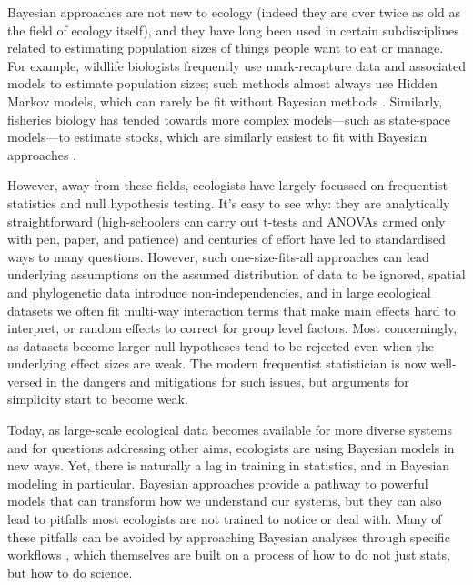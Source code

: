 \documentclass[11pt]{article}
\begin{document}
{Bayesian approaches are not new to ecology (indeed they are over twice as old as the field of ecology itself), and they have long been used in certain subdisciplines related to estimating population sizes of things people want to eat or manage. For example, wildlife biologists frequently use mark-recapture data and associated models to estimate population sizes; such methods almost always use Hidden Markov models, which can rarely be fit without Bayesian methods \citep{muthuku2008,zheng2007}. Similarly, fisheries biology has tended towards more complex models---such as state-space models---to estimate stocks, which are similarly easiest to fit with Bayesian approaches \citep{trijoulet2018,millar2000}. %

However, away from these fields, ecologists have largely focussed on frequentist statistics and null hypothesis testing. It's easy to see why: they are analytically straightforward (high-schoolers can carry out t-tests and ANOVAs armed only with pen, paper, and patience) and centuries of effort have led to standardised ways to many questions. 
However, such one-size-fits-all approaches can lead underlying assumptions on the assumed distribution of data to be ignored, spatial and phylogenetic data introduce non-independencies, and in large ecological datasets we often fit multi-way interaction terms that make main effects hard to interpret, or random effects to correct for group level factors. Most concerningly, as datasets become larger null hypotheses tend to be rejected even when the underlying effect sizes are weak.
The modern frequentist statistician is now well-versed in the dangers and mitigations for such issues, but arguments for simplicity start to become weak.

Today, as large-scale ecological data becomes available for more diverse systems and for questions addressing other aims, ecologists are using Bayesian models in new ways. Yet, there is naturally a lag in training in statistics, and in Bayesian modeling in particular. Bayesian approaches provide a pathway to powerful models that can transform how we understand our systems, but they can also lead to pitfalls most ecologists are not trained to notice or deal with. Many of these pitfalls can be avoided by approaching Bayesian analyses through specific workflows \citep{betanworkflow,vandeschoot2021}, which themselves are built on a process of how to do not just stats, but how to do science. 

}
\end{document}
